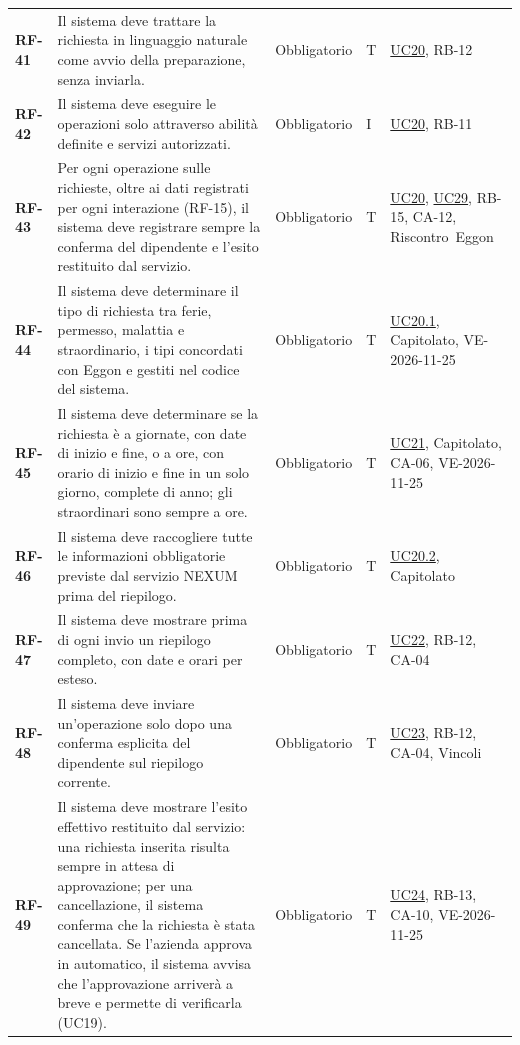 \documentclass[documento]{gpt}
\begin{document}
{\begin{longtable}{@{}>{\raggedright\arraybackslash}p{1.35cm}>{\raggedright\arraybackslash}p{7.3cm}>{\raggedright\arraybackslash}p{1.9cm}>{\centering\arraybackslash}p{0.75cm}>{\raggedright\arraybackslash}p{3.1cm}@{}}
\leavevmode\hypertarget{req:RF-41}{\textbf{RF-41}} & Il sistema deve trattare la richiesta in linguaggio naturale come avvio della preparazione, senza inviarla. & Obbligatorio & T & \hyperref[uc:registra]{UC20}, \mbox{RB-12} \\
\leavevmode\hypertarget{req:RF-42}{\textbf{RF-42}} & Il sistema deve eseguire le operazioni solo attraverso abilità definite e servizi autorizzati. & Obbligatorio & I & \hyperref[uc:registra]{UC20}, \mbox{RB-11} \\
\leavevmode\hypertarget{req:RF-43}{\textbf{RF-43}} & Per ogni operazione sulle richieste, oltre ai dati registrati per ogni interazione (RF-15), il sistema deve registrare sempre la conferma del dipendente e l’esito restituito dal servizio. & Obbligatorio & T & \hyperref[uc:registra]{UC20}, \hyperref[uc:annulla_inv]{UC29}, \mbox{RB-15}, \mbox{CA-12}, \mbox{Riscontro Eggon} \\
\leavevmode\hypertarget{req:RF-44}{\textbf{RF-44}} & Il sistema deve determinare il tipo di richiesta tra ferie, permesso, malattia e straordinario, i tipi concordati con Eggon e gestiti nel codice del sistema. & Obbligatorio & T & \hyperref[uc:reg_tipo]{UC20.1}, \mbox{Capitolato}, \mbox{VE-2026-11-25} \\
\leavevmode\hypertarget{req:RF-45}{\textbf{RF-45}} & Il sistema deve determinare se la richiesta è a giornate, con date di inizio e fine, o a ore, con orario di inizio e fine in un solo giorno, complete di anno; gli straordinari sono sempre a ore. & Obbligatorio & T & \hyperref[uc:periodo]{UC21}, \mbox{Capitolato}, \mbox{CA-06}, \mbox{VE-2026-11-25} \\
\leavevmode\hypertarget{req:RF-46}{\textbf{RF-46}} & Il sistema deve raccogliere tutte le informazioni obbligatorie previste dal servizio NEXUM prima del riepilogo. & Obbligatorio & T & \hyperref[uc:reg_campi]{UC20.2}, \mbox{Capitolato} \\
\leavevmode\hypertarget{req:RF-47}{\textbf{RF-47}} & Il sistema deve mostrare prima di ogni invio un riepilogo completo, con date e orari per esteso. & Obbligatorio & T & \hyperref[uc:op_riep]{UC22}, \mbox{RB-12}, \mbox{CA-04} \\
\leavevmode\hypertarget{req:RF-48}{\textbf{RF-48}} & Il sistema deve inviare un’operazione solo dopo una conferma esplicita del dipendente sul riepilogo corrente. & Obbligatorio & T & \hyperref[uc:op_conf]{UC23}, \mbox{RB-12}, \mbox{CA-04}, \mbox{Vincoli} \\
\leavevmode\hypertarget{req:RF-49}{\textbf{RF-49}} & Il sistema deve mostrare l’esito effettivo restituito dal servizio: una richiesta inserita risulta sempre in attesa di approvazione; per una cancellazione, il sistema conferma che la richiesta è stata cancellata. Se l’azienda approva in automatico, il sistema avvisa che l’approvazione arriverà a breve e permette di verificarla (UC19). & Obbligatorio & T & \hyperref[uc:op_esito]{UC24}, \mbox{RB-13}, \mbox{CA-10}, \mbox{VE-2026-11-25} \\

\end{longtable}}
\end{document}
